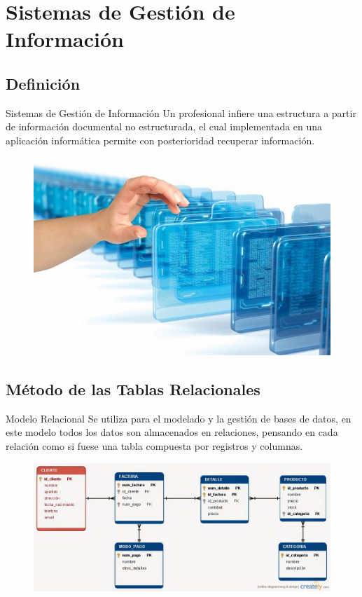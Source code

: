 \documentclass{beamer}
\begin{document}
\section{Sistemas de Gestión de Información}
\subsection{Definición}
\begin{frame}
\begin{block}{Sistemas de Gestión de Información}
Un profesional infiere una estructura a partir de información documental no estructurada, el cual implementada en una aplicación informática permite con posterioridad recuperar información.
\begin{figure}
\includegraphics[scale=0.3]{gestion.jpg}
\centering
\end{figure}
\end{block}
\end{frame}

\subsection{Método de las Tablas Relacionales}
\begin{frame}
\begin{block}{Modelo Relacional}
Se utiliza para el modelado y la gestión de bases de datos, en este modelo todos los datos son almacenados en relaciones, pensando en cada relación como si fuese una tabla compuesta por registros y columnas.
\begin{figure}
\includegraphics[scale=0.2]{ModeloRelacional.jpg}
\centering
\end{figure}
\end{block}
\end{frame}
\end{document}
